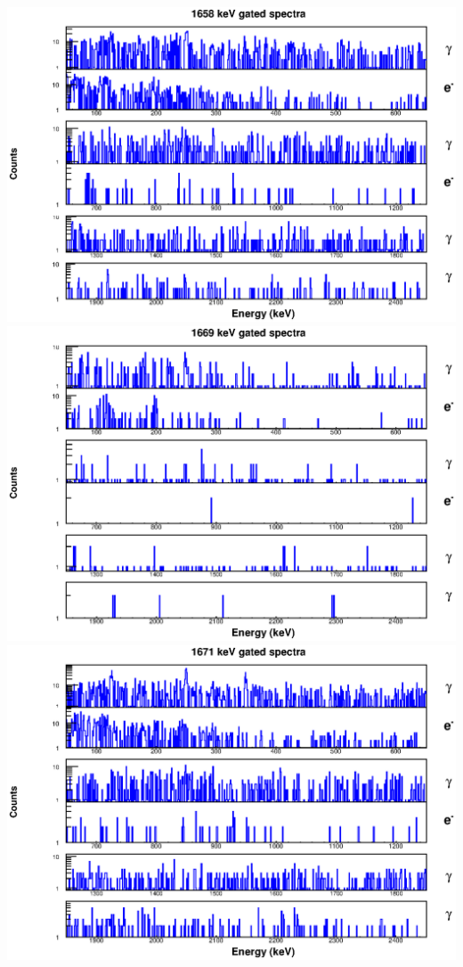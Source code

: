 \includegraphics[scale=0.8]{154Gd_Appendix/1658_combined.eps}
\includegraphics[scale=0.8]{154Gd_Appendix/1669_combined.eps}
\includegraphics[scale=0.8]{154Gd_Appendix/1671_combined.eps}
